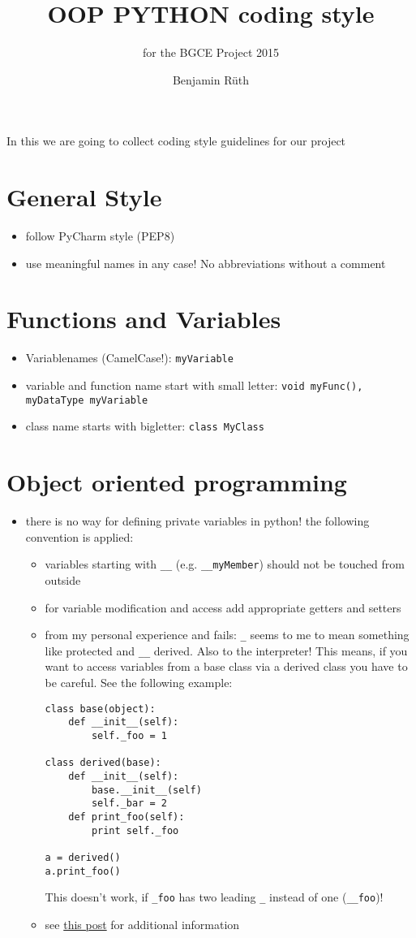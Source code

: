 \documentclass[10pt,a4paper]{scrartcl}
\title{OOP PYTHON coding style}
\author{Benjamin Rüth}
\subtitle{for the BGCE Project 2015}
\begin{document}
\maketitle
In this we are going to collect coding style guidelines for our project

\section{General Style}
\begin{itemize}
\item follow PyCharm style (PEP8)
\item use meaningful names in any case! No abbreviations without a comment
\end{itemize}

\section{Functions and Variables}
\begin{itemize}
\item Variablenames (CamelCase!): \verb+myVariable+
\item variable and function name start with small letter: \texttt{void myFunc(), myDataType myVariable}
\item class name starts with bigletter: \texttt{class MyClass}
\end{itemize}

\section{Object oriented programming}
\begin{itemize}
\item there is no way for defining private variables in python! the following convention is applied:
\begin{itemize}
\item variables starting with \verb+__+ (e.g. \verb+__myMember+) should not be touched from outside
\item for variable modification and access add appropriate getters and setters
\item from my personal experience and fails: \verb+_+ seems to me to mean something like protected and \verb+__+ derived. Also to the interpreter! This means, if you want to access variables from a base class via a derived class you have to be careful. See the following example:
\begin{verbatim}
class base(object):    
    def __init__(self):
        self._foo = 1

class derived(base):    
    def __init__(self):
        base.__init__(self)
        self._bar = 2
    def print_foo(self):
        print self._foo

a = derived()
a.print_foo()
\end{verbatim}
This doesn't work, if \verb+_foo+ has two leading \verb+_+ instead of one (\verb+__foo+)!
\item see \href{http://stackoverflow.com/questions/1641219/does-python-have-private-variables-in-classes}{this post} for additional information
\end{itemize}

\end{itemize}
\end{document}
